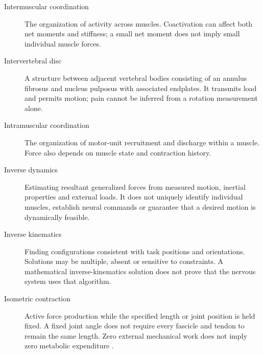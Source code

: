 \begin{description}
\item[Intermuscular coordination] The organization of activity across muscles. Coactivation can affect both net moments and stiffness; a small net moment does not imply small individual muscle forces.

\item[Intervertebral disc] A structure between adjacent vertebral bodies consisting of an annulus fibrosus and nucleus pulposus with associated endplates. It transmits load and permits motion; pain cannot be inferred from a rotation measurement alone.

\item[Intramuscular coordination] The organization of motor-unit recruitment and discharge within a muscle. Force also depends on muscle state and contraction history.

\item[Inverse dynamics] Estimating resultant generalized forces from measured motion, inertial properties and external loads. It does not uniquely identify individual muscles, establish neural commands or guarantee that a desired motion is dynamically feasible.

\item[Inverse kinematics] Finding configurations consistent with task positions and orientations. Solutions may be multiple, absent or sensitive to constraints. A mathematical inverse-kinematics solution does not prove that the nervous system uses that algorithm.

\item[Isometric contraction] Active force production while the specified length or joint position is held fixed. A fixed joint angle does not require every fascicle and tendon to remain the same length. Zero external mechanical work does not imply zero metabolic expenditure \citep{glossaryMuscleTension}.

\end{description}
